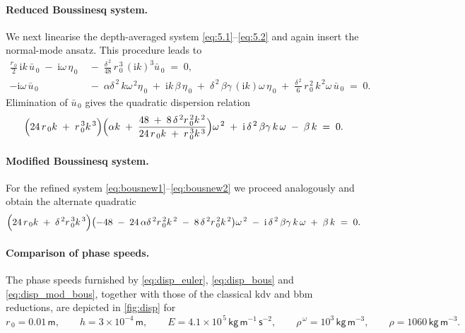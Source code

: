 \documentclass[alpha-refs, 12pt]{wiley-article}
\newcommand{\ui}{\mathrm{i}}
\begin{document}
\paragraph{Reduced Boussinesq system.} We next linearise the depth-averaged system \eqref{eq:5.1}--\eqref{eq:5.2} and again insert the normal-mode ansatz. This procedure leads to
\begin{align}
  \frac{r_{\,0}}{2}\,\ui k\,\bar{u}_{\,0}\;-\;\ui\omega\,\eta_{\,0}
  &\;-\;\frac{\delta^{\,2}}{48}\,r_{\,0}^{\,3}\,(\ui k)^{3}\bar{u}_{\,0}
  \;=\;0, \label{eq:lin_red1}\\
  -\ui\omega\,\bar{u}_{\,0}
  &\;-\;\alpha\delta^{\,2}\,k\omega^{\,2}\eta_{\,0}
  \;+\;\ui k\,\beta\,\eta_{\,0}
  \;+\;\delta^{\,2}\,\beta\gamma\,(\ui k)\omega\,\eta_{\,0}
  \;+\;\frac{\delta^{\,2}}{6}\,r_{\,0}^{\,2}\,k^{\,2}\omega\,\bar{u}_{\,0}
  \;=\;0. \label{eq:lin_red2}
\end{align}
Elimination of $\bar{u}_{\,0}$ gives the quadratic dispersion relation
\begin{equation}\label{eq:disp_bous}
  \Bigl(24\,r_{\,0}k\;+\;r_{\,0}^{\,3}k^{\,3}\Bigr)\Bigl(\alpha k\;+\;
  \frac{48\;+\;8\,\delta^{\,2}r_{\,0}^{\,2}k^{\,2}}{24\,r_{\,0}k\;+\;r_{\,0}^{\,3}k^{\,3}}\Bigr)\omega^{\,2}
  \;+\;\ui\,\delta^{\,2}\,\beta\gamma\,k\,\omega\;-\;\beta\,k\;=\;0.
\end{equation}

\paragraph{Modified Boussinesq system.} For the refined system \eqref{eq:bousnew1}--\eqref{eq:bousnew2} we proceed analogously and obtain the alternate quadratic
\begin{equation}\label{eq:disp_mod_bous}
  \Bigl(24\,r_{\,0}k\;+\;\delta^{\,2}r_{\,0}^{\,3}k^{\,3}\Bigr)
  \bigl(-48\;-\;24\,\alpha\delta^{\,2}r_{\,0}^{\,2}k^{\,2}\;
  -\;8\,\delta^{\,2}r_{\,0}^{\,2}k^{\,2}\bigr)\omega^{\,2}
  \;-\;\ui\,\delta^{\,2}\,\beta\gamma\,k\,\omega
  \;+\;\beta\,k\;=\;0.
\end{equation}

\paragraph{Comparison of phase speeds.} The phase speeds furnished by \eqref{eq:disp_euler}, \eqref{eq:disp_bous} and \eqref{eq:disp_mod_bous}, together with those of the classical \acrshort{kdv} and \acrshort{bbm} reductions, are depicted in \cref{fig:disp} for
\[
  r_{\,0}=0.01\,\mathsf{m}, \qquad
  h=3\times10^{-4}\,\mathsf{m}, \qquad
  E=4.1\times10^{\,5}\,\mathsf{kg}\,\mathsf{m}^{-1}\,\mathsf{s}^{-2}, \qquad
  \rho^{\,\omega}=10^{3}\,\mathsf{kg}\,\mathsf{m}^{-3}, \qquad
  \rho=1060\,\mathsf{kg}\,\mathsf{m}^{-3}.
\]
\end{document}
